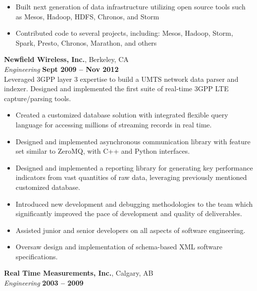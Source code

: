 \documentclass[margin,line]{resume}
\begin{document}
\begin{resume}
    \begin{itemize}
    \item Built next generation of data infrastructure utilizing open source
     tools such as Mesos, Hadoop, HDFS, Chronos, and Storm
    \item Contributed code to several projects, including: Mesos, Hadoop,
     Storm, Spark, Presto, Chronos, Marathon, and others
    \end{itemize}

    \textbf{Newfield Wireless, Inc.}, Berkeley, CA \vspace{2mm}\\\vspace{1mm}%
    \textsl{Engineering} \hfill \textbf{Sept 2009 -- Nov 2012}\\
    Leveraged 3GPP layer 3 expertise to build a UMTS network data parser and
    indexer. Designed and implemented the first suite of real-time 3GPP LTE
    capture/parsing tools.

    \begin{itemize}
    \item Created a customized database solution with integrated flexible query language for accessing millions of streaming records in real time.
    \item Designed and implemented asynchronous communication library with feature set similar to ZeroMQ, with C++ and Python interfaces.
    \item Designed and implemented a reporting library for generating key performance indicators from vast quantities of raw data, leveraging previously mentioned customized database.
    \item Introduced new development and debugging methodologies to the team which significantly improved the pace of development and quality of deliverables.
    \item Assisted junior and senior developers on all aspects of software engineering.
    \item Oversaw design and implementation of schema-based XML software specifications.
    \end{itemize}

    \textbf{Real Time Measurements, Inc.}, Calgary, AB \vspace{2mm}\\\vspace{1mm}%
    \textsl{Engineering} \hfill \textbf{2003 -- 2009}\\


\end{resume}
\end{document}
